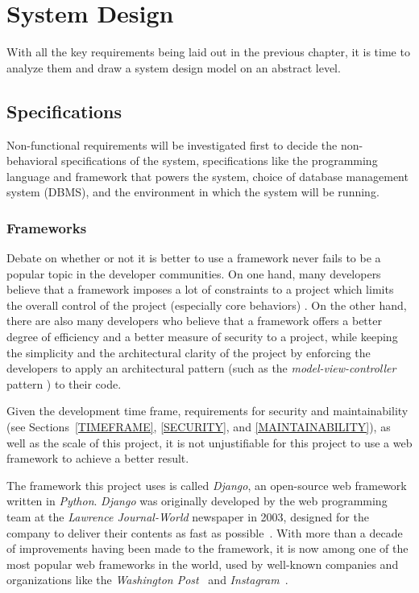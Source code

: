 

\chapter{System Design}
\label{chap:SYSDES}

With all the key requirements being laid out in the previous chapter, it is
time to analyze them and draw a system design model on an abstract
level. 

\section{Specifications}
Non-functional requirements will be investigated first to decide the
non-behavioral specifications of the system, specifications like the
programming language and framework that powers the system, choice of database
management system (DBMS),
and the environment in which the system will be running.

\subsection{Frameworks}
Debate on whether or not it is better to use a framework never fails to be
a popular topic in the developer communities. On one hand, many developers
believe that a framework imposes a lot of constraints to a project which limits the
overall control of the project (especially core behaviors) \cite{frameworks}.
On the other hand, there are also many developers who believe that a framework
offers a better degree of efficiency and a better
measure of security to a project, while keeping the simplicity and
the architectural clarity of the project by enforcing the developers to apply
an architectural pattern (such as the \emph{model-view-controller} pattern
\cite{mvc}) to their code.

\medskip

Given the development time frame, requirements for
security and maintainability (see Sections~\ref{TIMEFRAME},
\ref{SECURITY}, and \ref{MAINTAINABILITY}),
as well as the scale of this project,
it is not unjustifiable for this project to use a web framework to achieve a
better result.

\medskip

The framework this project uses is called \emph{Django}, an open-source web
framework written in \emph{Python}. \emph{Django} was originally developed by
the web programming team at the \emph{Lawrence Journal-World} newspaper in 2003,
designed for the company to deliver their contents as fast as
possible~\cite[Chapter 1]{django}.
With more than a decade of improvements
having been made to the framework, it is now among one of the most popular web
frameworks in the world, used by well-known companies and organizations like the
\emph{Washington Post}~\cite{djangoWashingtonPost}
and \emph{Instagram}~\cite{djangoInstagram}.
\medskip

